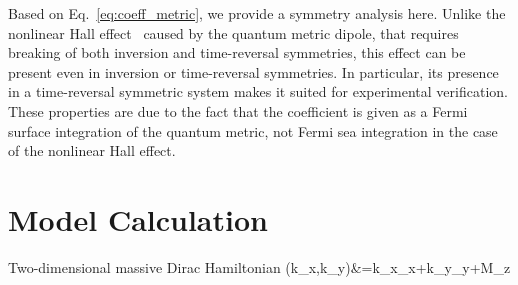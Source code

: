 \documentclass[aps,prb,longbibliography,superscriptaddress,twocolumn]{revtex4-2}
\def\be#1\ee{\begin{align}#1\end{align}}
\begin{document}
Based on Eq.~\eqref{eq:coeff_metric}, we provide a symmetry analysis here. Unlike the nonlinear Hall effect~\cite{Liu_2021,Kamal_2023} caused by the quantum metric dipole, that requires breaking of both inversion and time-reversal symmetries, this effect can be present even in inversion or time-reversal symmetries. In particular, its presence in a time-reversal symmetric system makes it suited for experimental verification. These properties are due to the fact that the coefficient is given as a Fermi surface integration of the quantum metric, not Fermi sea integration in the case of the nonlinear Hall effect.


\section{Model Calculation}
Two-dimensional massive Dirac Hamiltonian
\be
    H(k_x,k_y)&=k_x\sigma_x+k_y\sigma_y+M\sigma_z
\ee




\end{document}
